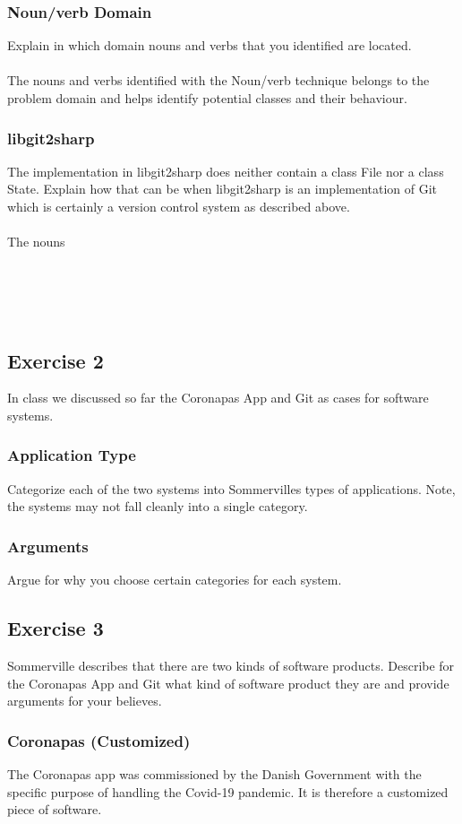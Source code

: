 \documentclass{article}
\begin{document}
\subsubsection*{Noun/verb Domain}
Explain in which domain nouns and verbs that you identified are located.
\\\\
The nouns and verbs identified with the Noun/verb technique belongs to the problem domain and helps identify potential classes and their behaviour.
\subsubsection*{libgit2sharp}
The implementation in libgit2sharp does neither contain a class File nor a class State. Explain how that can be when libgit2sharp is an implementation of Git which is certainly a version control system as described above.
\\\\
The nouns
\\\\\\\\\\
\subsection*{Exercise 2}
In class we discussed so far the Coronapas App and Git as cases for software systems.
\subsubsection*{Application Type}
Categorize each of the two systems into Sommervilles types of applications. Note, the systems may not fall cleanly into a single category.


\subsubsection*{Arguments}
Argue for why you choose certain categories for each system.


\subsection*{Exercise 3}
Sommerville describes that there are two kinds of software products. Describe for the Coronapas App and Git what kind of software product they are and provide arguments for your believes.

\subsubsection*{Coronapas (Customized)}
The Coronapas app was commissioned by the Danish Government with the specific purpose of handling the Covid-19 pandemic. It is therefore a customized piece of software.
\end{document}
